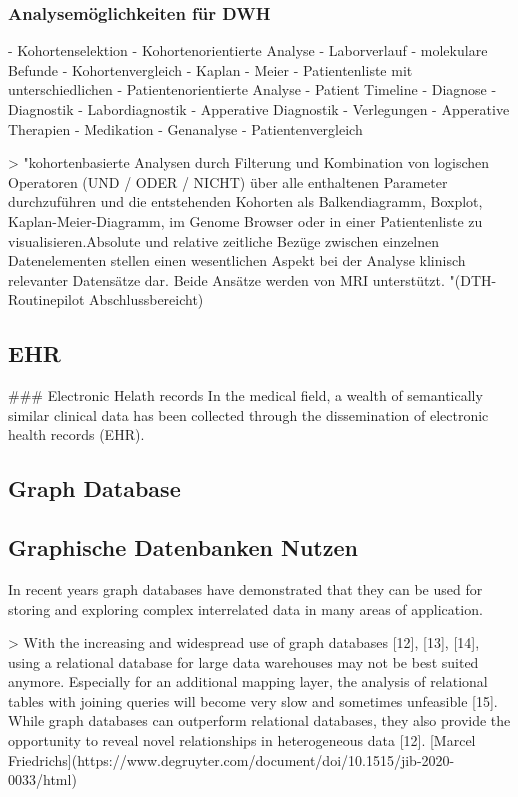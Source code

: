 \subsubsection{Analysemöglichkeiten für DWH}

- Kohortenselektion
- Kohortenorientierte Analyse
	- Laborverlauf
	- molekulare Befunde
- Kohortenvergleich
	- Kaplan - Meier
	- Patientenliste mit unterschiedlichen 
- Patientenorientierte Analyse
	- Patient Timeline
		- Diagnose
		- Diagnostik
			- Labordiagnostik
			- Apperative Diagnostik
		- Verlegungen
		- Apperative Therapien
		- Medikation
	- Genanalyse
- Patientenvergleich

> "kohortenbasierte Analysen durch Filterung und Kombination von logischen Operatoren (UND / ODER / NICHT) über alle enthaltenen Parameter durchzuführen und die entstehenden Kohorten als Balkendiagramm, Boxplot, Kaplan-Meier-Diagramm, im Genome Browser oder in einer Patientenliste zu visualisieren.Absolute und relative zeitliche Bezüge zwischen einzelnen Datenelementen stellen einen wesentlichen Aspekt bei der Analyse klinisch relevanter Datensätze dar. Beide Ansätze werden von MRI unterstützt. "(DTH- Routinepilot Abschlussbereicht)



\subsection{EHR}

### Electronic Helath records
In the medical field, a wealth of semantically similar clinical data has been collected through the dissemination of electronic health records (EHR).

\subsection{Graph Database}

\subsection{Graphische Datenbanken Nutzen}

In recent years graph databases have demonstrated that they can be used for storing and exploring complex interrelated data in many areas of application. 

> With the increasing and widespread use of graph databases [12], [13], [14], using a relational database for large data warehouses may not be best suited anymore. Especially for an additional mapping layer, the analysis of relational tables with joining queries will become very slow and sometimes unfeasible [15]. While graph databases can outperform relational databases, they also provide the opportunity to reveal novel relationships in heterogeneous data [12]. [Marcel Friedrichs](https://www.degruyter.com/document/doi/10.1515/jib-2020-0033/html)


